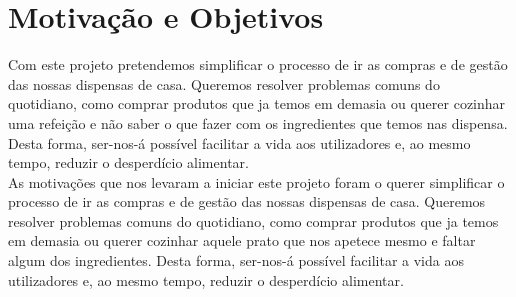 \documentclass[a4paper]{report}
\begin{document}
    \section{Motivação e Objetivos}
    Com este projeto pretendemos simplificar o processo de ir as compras e de
    gestão das nossas dispensas de casa. Queremos resolver problemas comuns do
    quotidiano, como comprar produtos que ja temos em demasia ou querer cozinhar
    uma refeição e não saber o que fazer com os ingredientes que temos nas
    dispensa. Desta forma, ser-nos-á possível facilitar a vida aos utilizadores
    e, ao mesmo tempo, reduzir o desperdício alimentar.\\
    As motivações que nos levaram a iniciar este projeto foram o querer simplificar
    o processo de ir as compras e de gestão das nossas dispensas de casa.
    Queremos resolver problemas comuns do quotidiano, como comprar produtos que 
    ja temos em demasia ou querer cozinhar aquele prato
    que nos apetece mesmo e faltar algum dos ingredientes. 
    Desta forma, ser-nos-á possível facilitar a vida aos utilizadores e, 
    ao mesmo tempo, reduzir o desperdício alimentar.
\end{document}

